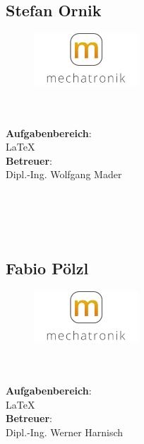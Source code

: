 \subsection*{Stefan Ornik}
\begin{figure}
\begin{center}
  \includegraphics[width=0.35\textwidth]{fig/logoMecha}
\end{center}
\end{figure}
\mbox{}\\
\mbox{}\\
\textbf{Aufgabenbereich}:\\
\LaTeX{}\\
\textbf{Betreuer}:\\
Dipl.-Ing. Wolfgang Mader
\mbox{}\\
\mbox{}\\
\mbox{}\\
\mbox{}\\
\mbox{}\\
\newpage

\subsection*{Fabio Pölzl}
\begin{figure}
\begin{center}
  \includegraphics[width=0.35\textwidth]{fig/logoMecha}
\end{center}
\end{figure}
\mbox{}\\
\mbox{}\\
\textbf{Aufgabenbereich}:\\
\LaTeX{}\\
\textbf{Betreuer}:\\
Dipl.-Ing. Werner Harnisch
\mbox{}\\
\mbox{}\\
\mbox{}\\
\mbox{}\\
\mbox{}\\
\mbox{}\\

